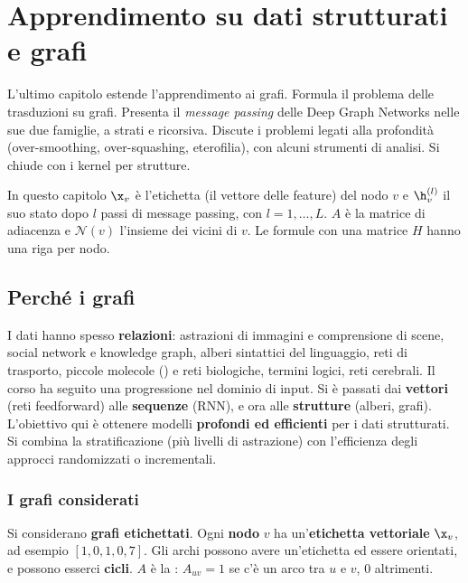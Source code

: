 \chapter{Apprendimento su dati strutturati e grafi}
\label{cap:grafi}

\begin{inbreve}
L'ultimo capitolo estende l'apprendimento ai grafi. Formula il problema delle trasduzioni su grafi. Presenta il
\emph{message passing} delle Deep Graph Networks nelle sue due famiglie, a strati e ricorsiva. Discute i problemi
legati alla profondità (over-smoothing, over-squashing, eterofilia), con alcuni strumenti di analisi. Si chiude con
i kernel per strutture.
\end{inbreve}

\begin{attenzione}[Notazione]
In questo capitolo $\x_v$ è l'etichetta (il vettore delle feature) del nodo $v$ e $\h_v^{(l)}$ il suo stato dopo $l$
passi di message passing, con $l=1,\dots,L$. $A$ è la matrice di adiacenza e $\mathcal N(v)$ l'insieme dei vicini di
$v$. Le formule con una matrice $H$ hanno una riga per nodo.
\end{attenzione}

\section{Perché i grafi}

I dati hanno spesso \textbf{relazioni}: astrazioni di immagini e comprensione di scene, social network e knowledge
graph, alberi sintattici del linguaggio, reti di trasporto, piccole molecole () e reti biologiche,
termini logici, reti cerebrali. Il corso ha seguito una progressione nel dominio di input. Si è passati dai
\textbf{vettori} (reti feedforward) alle \textbf{sequenze} (RNN), e ora alle \textbf{strutture} (alberi, grafi).
L'obiettivo qui è ottenere modelli \textbf{profondi ed efficienti} per i dati strutturati. Si combina la
stratificazione (più livelli di astrazione) con l'efficienza degli approcci randomizzati o incrementali.

\subsection{I grafi considerati}

Si considerano \textbf{grafi etichettati}. Ogni \textbf{nodo} $v$ ha un'\textbf{etichetta vettoriale} $\x_v$, ad
esempio $[1,0,1,0{,}7]$. Gli archi possono avere un'etichetta ed essere orientati, e possono esserci
\textbf{cicli}. $A$ è la : $A_{uv}=1$ se c'è un arco tra $u$ e $v$, 0 altrimenti.

